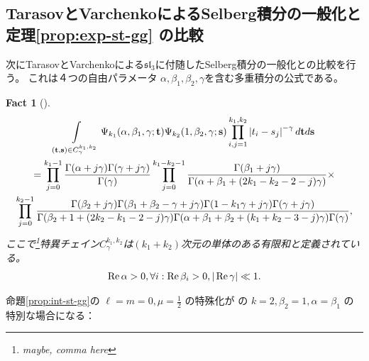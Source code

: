 \documentclass[12pt,a4paper,dvipdfmx]{jsarticle}
\numberwithin{equation}{section}
\newcommand{\myre}[1]{\tmop{Re} #1}
\newcommand{\bolds}{\mathbf{s}}
\newcommand{\tmop}[1]{\ensuremath{\operatorname{#1}}}
\theoremstyle{jplain}
\newtheorem{fact}[thm]{Fact}
\theoremstyle{remark}
\theoremstyle{definition}
\newcommand{\doubt}[1]{\fbox{#1}}
\begin{document}
		\subsection{TarasovとVarchenkoによるSelberg積分の一般化と定理\ref{prop:exp-st-gg}
	の比較}
	次にTarasovとVarchenkoによる$\mathfrak{sl}_3$に付随したSelberg積分の一般化との比較を行う。
	これは４つの自由パラメータ
	$\alpha,\beta_1,\beta_2,\gamma$を含む多重積分の公式である。
			\begin{fact}[{\cite[(3.4)]{tarasov2003selberg}}]
			{
				\begin{multline}
				\displaystyle\int_{(\boldt,\bolds)\in C_\gamma^{k_1,k_2}}
				\Psi_{k_1}(\alpha,\beta_1,\gamma;\boldt)\Psi_{k_2}(1,\beta_2,\gamma
				;\bolds)
				\displaystyle\prod_{i,j=1}^{k_1,k_2}\myabs{t_i-s_j}^{-\gamma}
				d\boldt d\bolds\\
  =\displaystyle\prod_{j = 0}^{k_1 - 1} \frac{\Gamma (\alpha + j \gamma) \Gamma (\gamma + j
  \gamma)}{\Gamma (\gamma)} \displaystyle\prod_{j = 0}^{k_1 - k_2 - 1} \frac{\Gamma
  (\beta_1 + j \gamma)}{\Gamma (\alpha + \beta_1 + (2 k_1 - k_2 - 2 - j)
  \gamma)} \times\\
  \displaystyle\prod_{j = 0}^{k_2 - 1} \frac{\Gamma (\beta_2 + j \gamma) \Gamma (\beta_1 +
  \beta_2 - \gamma + j \gamma) \Gamma (1 - k_1 \gamma + j \gamma) \Gamma
  (\gamma + j \gamma)}{\Gamma (\beta_2 + 1 + (2 k_2 - k_1 - 2 - j) \gamma)
  \Gamma (\alpha + \beta_1 + \beta_2 + (k_1 + k_2 - 3 - j) \gamma) \Gamma
  (\gamma)},\\
				\end{multline}
  ここで\footnote{maybe, comma here}特異チェイン$C^{k_1,k_2}_{\gamma}$は$(k_1+k_2)$次元の単体のある有限和と\doubt{して}定義されている。
				\begin{equation*}
					\begin{array}[]{c}
			  \myre{\alpha} > 0,\forall i:\myre{\beta_i}>0, | \tmop{Re} \gamma | \ll 1.
					\end{array}
				\end{equation*}
				}
		\end{fact}
		命題\ref{prop:int-st-gg}の $\ell = m = 0,\mu=\frac{1}{2}$ の特殊化が
		\cite[(3.4)]{tarasov2003selberg}
の $k = 2,\beta_2=1,\alpha=\beta_1$ の特別な場合になる：\\
\end{document}
